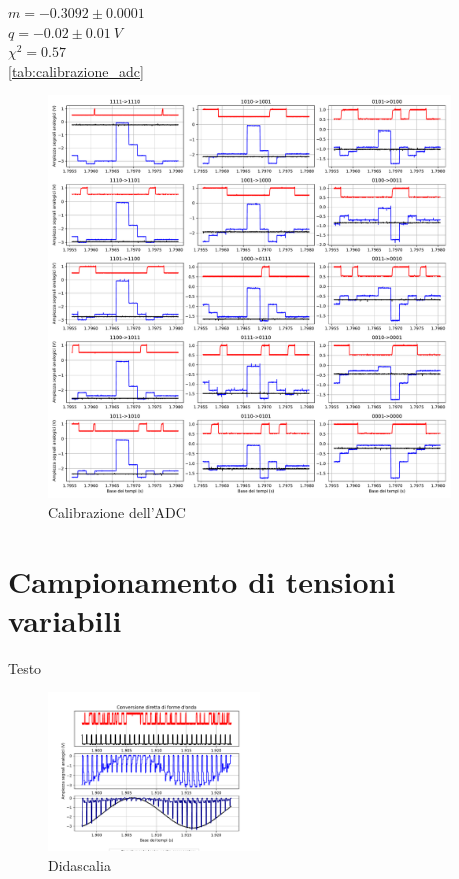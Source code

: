 \documentclass[journal]{IEEEtran}
\begin{document}
$ m = -0.3092 \pm 0.0001 $ \\
$ q = -0.02 \pm 0.01 \ V$ \\
$ \chi^{2} = 0.57 $ \\

\ref{tab:calibrazione_adc}

\begin{figure}[t]%
\centering
\includegraphics[trim = {30 0 50 0}, width=0.95\textwidth]{analysis/output/calibration.pdf}
\caption{Calibrazione dell'ADC}
\label{fig:waveforms_no_sh_scope}
\end{figure}

\section{Campionamento di tensioni variabili}
Testo

\begin{figure}[H]%
\begin{center}
\includegraphics[trim = {0 25 0 0},clip, width=0.50\textwidth]{analysis/output/direct_aq_waveforms.pdf}
\caption{Didascalia}
\label{fig:circuit_DAC}
\end{center}
\end{figure}
\end{document}
